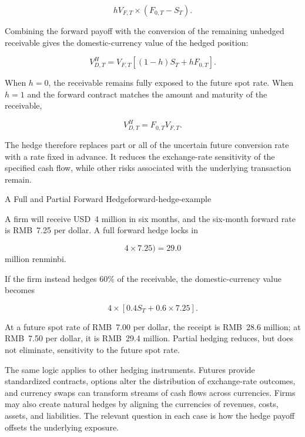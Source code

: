 \begin{equation}
hV_{F,T}\times(F_{0,T}-S_T).
\label{eq:ch10-export-forward-payoff}
\end{equation}

Combining the forward payoff with the conversion
of the remaining unhedged receivable gives the
domestic-currency value of the hedged position:

\begin{equation}
V_{D,T}^{H}
=
V_{F,T}\left[(1-h)S_T+hF_{0,T}\right].
\label{eq:ch10-partial-forward-hedge}
\end{equation}

When $h=0$, the receivable remains fully exposed
to the future spot rate. When $h=1$ and the
forward contract matches the amount and maturity
of the receivable,

\begin{equation}
V_{D,T}^{H}=F_{0,T}V_{F,T}.
\label{eq:ch10-full-forward-hedge}
\end{equation}

The hedge therefore replaces part or all of the
uncertain future conversion rate with a rate
fixed in advance. It reduces the exchange-rate
sensitivity of the specified cash flow, while
other risks associated with the underlying
transaction remain.

\begin{example}{A Full and Partial Forward Hedge}{forward-hedge-example}

A firm will receive USD~4 million in six months, and the six-month forward rate is RMB~7.25 per dollar. A full forward hedge locks in

$$
4\times 7.25)=29.0
$$
million renminbi.

If the firm instead hedges 60\% of the receivable, the domestic-currency value becomes

$$
4\times\left[0.4S_T+0.6\times 7.25\right].
$$

At a future spot rate of RMB~7.00 per dollar, the receipt is RMB~28.6 million; at RMB~7.50 per dollar, it is RMB~29.4 million. Partial hedging reduces, but does not eliminate, sensitivity to the future spot rate.

\end{example}

The same logic applies to other hedging instruments. Futures provide standardized contracts, options alter the distribution of exchange-rate outcomes, and currency swaps can transform streams of cash flows across currencies. Firms may also create natural hedges by aligning the currencies of revenues, costs, assets, and liabilities. The relevant question in each case is how the hedge payoff offsets the underlying exposure.

